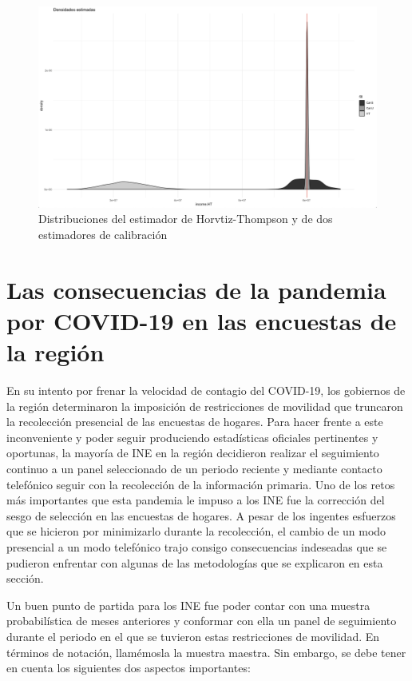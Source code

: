 \documentclass[
  12pt,
  spanish,
]{book}
\begin{document}
\begin{figure}

{\centering \includegraphics[width=0.5\linewidth]{Pics/c12} 

}

\caption{Distribuciones del estimador de Horvtiz-Thompson y de dos estimadores de calibración}\label{fig:fightcal2dist}
\end{figure}

\hypertarget{las-consecuencias-de-la-pandemia-por-covid-19-en-las-encuestas-de-la-regiuxf3n}{%
\section{Las consecuencias de la pandemia por COVID-19 en las encuestas de la región}\label{las-consecuencias-de-la-pandemia-por-covid-19-en-las-encuestas-de-la-regiuxf3n}}

En su intento por frenar la velocidad de contagio del COVID-19, los gobiernos de la región determinaron la imposición de restricciones de movilidad que truncaron la recolección presencial de las encuestas de hogares. Para hacer frente a este inconveniente y poder seguir produciendo estadísticas oficiales pertinentes y oportunas, la mayoría de INE en la región decidieron realizar el seguimiento continuo a un panel seleccionado de un periodo reciente y mediante contacto telefónico seguir con la recolección de la información primaria. Uno de los retos más importantes que esta pandemia le impuso a los INE fue la corrección del sesgo de selección en las encuestas de hogares. A pesar de los ingentes esfuerzos que se hicieron por minimizarlo durante la recolección, el cambio de un modo presencial a un modo telefónico trajo consigo consecuencias indeseadas que se pudieron enfrentar con algunas de las metodologías que se explicaron en esta sección.

Un buen punto de partida para los INE fue poder contar con una muestra probabilística de meses anteriores y conformar con ella un panel de seguimiento durante el periodo en el que se tuvieron estas restricciones de movilidad. En términos de notación, llamémosla la muestra maestra. Sin embargo, se debe tener en cuenta los siguientes dos aspectos importantes:
\end{document}
